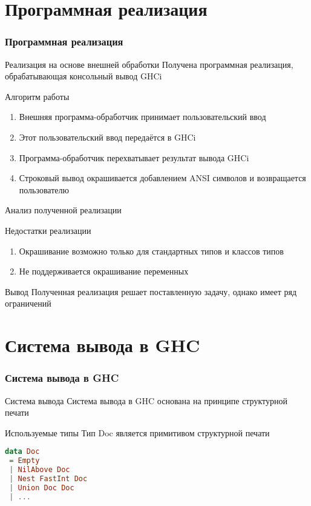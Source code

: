 \documentclass[utf8,russian]{beamer}
\begin{document}
\section{Программная реализация}
\begin{frame}
\frametitle{Программная реализация}

\begin{block}{Реализация на основе внешней обработки}
Получена программная реализация, обрабатывающая консольный вывод GHCi
\end{block}

\begin{block}{Алгоритм работы}
\begin{enumerate}
  \item Внешняя программа-обработчик принимает пользовательский ввод
  \item Этот пользовательский ввод передаётся в GHCi
  \item Программа-обработчик перехватывает результат вывода GHCi
  \item Строковый вывод окрашивается добавлением ANSI символов и возвращается пользователю
\end{enumerate}
\end{block}
\end{frame}
\begin{frame}{Анализ полученной реализации}

\begin{block}{Недостатки реализации}

  \begin{enumerate}
    \item Окрашивание возможно только для стандартных типов и классов типов
    \item Не поддерживается окрашивание переменных
  \end{enumerate}
\end{block}


\begin{block}{Вывод}
Полученная реализация решает поставленную задачу, однако имеет ряд ограничений
\end{block}

\end{frame}

\section{Система вывода в GHC}

\begin{frame}[fragile]
\frametitle{Система вывода в GHC}
\begin{block}{Система вывода}
Система вывода в GHC основана на принципе структурной печати
\end{block}

\begin{block}{Используемые типы}
Тип Doc является примитивом структурной печати
\begin{lstlisting}[language=Haskell]
data Doc
 = Empty
 | NilAbove Doc
 | Nest FastInt Doc
 | Union Doc Doc
 | ...
\end{lstlisting}
\end{block}
\end{frame}
\end{document}
